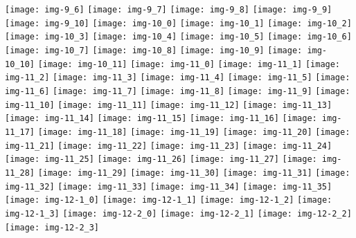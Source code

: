 \documentclass[a4paper]{article}
\begin{document}
	\texttt{[image: img-9\_6]}
	\texttt{[image: img-9\_7]}
	\texttt{[image: img-9\_8]}
	\texttt{[image: img-9\_9]}
	\texttt{[image: img-9\_10]}
	\texttt{[image: img-10\_0]}
	\texttt{[image: img-10\_1]}
	\texttt{[image: img-10\_2]}
	\texttt{[image: img-10\_3]}
	\texttt{[image: img-10\_4]}
	\texttt{[image: img-10\_5]}
	\texttt{[image: img-10\_6]}
	\texttt{[image: img-10\_7]}
	\texttt{[image: img-10\_8]}
	\texttt{[image: img-10\_9]}
	\texttt{[image: img-10\_10]}
	\texttt{[image: img-10\_11]}
	\texttt{[image: img-11\_0]}
	\texttt{[image: img-11\_1]}
	\texttt{[image: img-11\_2]}
	\texttt{[image: img-11\_3]}
	\texttt{[image: img-11\_4]}
	\texttt{[image: img-11\_5]}
	\texttt{[image: img-11\_6]}
	\texttt{[image: img-11\_7]}
	\texttt{[image: img-11\_8]}
	\texttt{[image: img-11\_9]}
	\texttt{[image: img-11\_10]}
	\texttt{[image: img-11\_11]}
	\texttt{[image: img-11\_12]}
	\texttt{[image: img-11\_13]}
	\texttt{[image: img-11\_14]}
	\texttt{[image: img-11\_15]}
	\texttt{[image: img-11\_16]}
	\texttt{[image: img-11\_17]}
	\texttt{[image: img-11\_18]}
	\texttt{[image: img-11\_19]}
	\texttt{[image: img-11\_20]}
	\texttt{[image: img-11\_21]}
	\texttt{[image: img-11\_22]}
	\texttt{[image: img-11\_23]}
	\texttt{[image: img-11\_24]}
	\texttt{[image: img-11\_25]}
	\texttt{[image: img-11\_26]}
	\texttt{[image: img-11\_27]}
	\texttt{[image: img-11\_28]}
	\texttt{[image: img-11\_29]}
	\texttt{[image: img-11\_30]}
	\texttt{[image: img-11\_31]}
	\texttt{[image: img-11\_32]}
	\texttt{[image: img-11\_33]}
	\texttt{[image: img-11\_34]}
	\texttt{[image: img-11\_35]}
	\texttt{[image: img-12-1\_0]}
	\texttt{[image: img-12-1\_1]}
	\texttt{[image: img-12-1\_2]}
	\texttt{[image: img-12-1\_3]}
	\texttt{[image: img-12-2\_0]}
	\texttt{[image: img-12-2\_1]}
	\texttt{[image: img-12-2\_2]}
	\texttt{[image: img-12-2\_3]}
\end{document}

